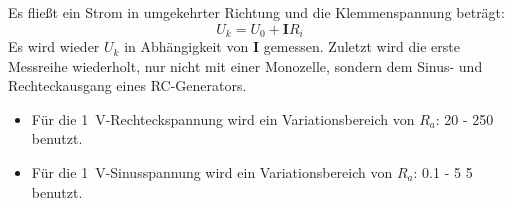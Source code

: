Es fließt ein Strom in umgekehrter Richtung und die Klemmenspannung beträgt:
\begin{equation}
  U_k = U_0 + \symbf{I} R_i
  \label{eqn:eq5}
\end{equation}
Es wird wieder $U_k$ in Abhängigkeit von $\symbf{I}$ gemessen.
Zuletzt wird die erste Messreihe wiederholt, nur nicht mit einer Monozelle, sondern dem Sinus- und Rechteckausgang eines RC-Generators.
\begin{itemize}
  \item Für die \SI{1}{\volt}-Rechteckspannung wird ein Variationsbereich von $R_a$: 20 - \SI{250}{\omega} benutzt.
  \item Für die \SI{1}{\volt}-Sinusspannung wird ein Variationsbereich von $R_a$: 0.1 - 5 \SI{5}{\kilo\omega} benutzt.
\end{itemize}
